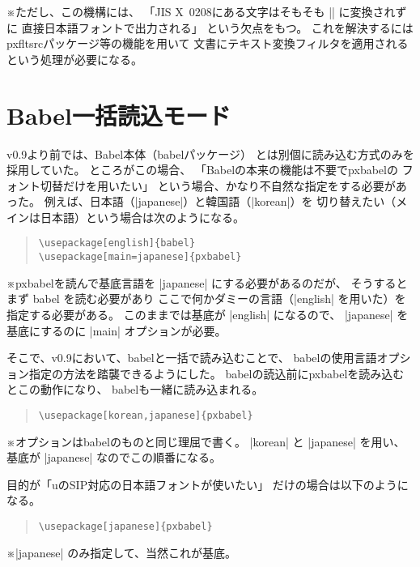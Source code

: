 \documentclass[a4paper,uplatex]{jsarticle}
\newcommand{\Pkg}[1]{\textsf{#1}}
\newcommand{\Note}{\par\noindent ※}
\providecommand{\upTeX}{u\pTeX}
\begin{document}
\Note ただし、この機構には、
「JIS X~0208にある文字はそもそも |\UTF| に変換されずに
直接日本語フォントで出力される」
という欠点をもつ。
これを解決するには\Pkg{pxfltsrc}パッケージ等の機能を用いて
文書にテキスト変換フィルタを適用されるという処理が必要になる。

\section{Babel一括読込モード}

v0.9より前では、Babel本体（\Pkg{babel}パッケージ）
とは別個に読み込む方式のみを採用していた。
ところがこの場合、
「Babelの本来の機能は不要で\Pkg{pxbabel}の
フォント切替だけを用いたい」
という場合、かなり不自然な指定をする必要があった。
例えば、日本語（|japanese|）と韓国語（|korean|）を
切り替えたい（メインは日本語）という場合は次のようになる。

\begin{quote}\begin{verbatim}
\usepackage[english]{babel}
\usepackage[main=japanese]{pxbabel}
\end{verbatim}\end{quote}
\Note \Pkg{pxbabel}を読んで基底言語を |japanese|
にする必要があるのだが、
そうするとまず \Pkg{babel} を読む必要があり
ここで何かダミーの言語（|english| を用いた）を指定する必要がある。
このままでは基底が |english| になるので、
|japanese| を基底にするのに |main| オプションが必要。

そこで、v0.9において、\Pkg{babel}と一括で読み込むことで、
\Pkg{babel}の使用言語オプション指定の方法を踏襲できるようにした。
\Pkg{babel}の読込前に\Pkg{pxbabel}を読み込むとこの動作になり、
\Pkg{babel}も一緒に読み込まれる。

\begin{quote}\begin{verbatim}
\usepackage[korean,japanese]{pxbabel}
\end{verbatim}\end{quote}
\Note オプションは\Pkg{babel}のものと同じ理屈で書く。
|korean| と |japanese| を用い、
基底が |japanese| なのでこの順番になる。

目的が「{\upTeX}のSIP対応の日本語フォントが使いたい」
だけの場合は以下のようになる。

\begin{quote}\begin{verbatim}
\usepackage[japanese]{pxbabel}
\end{verbatim}\end{quote}
\Note |japanese| のみ指定して、当然これが基底。
\end{document}
